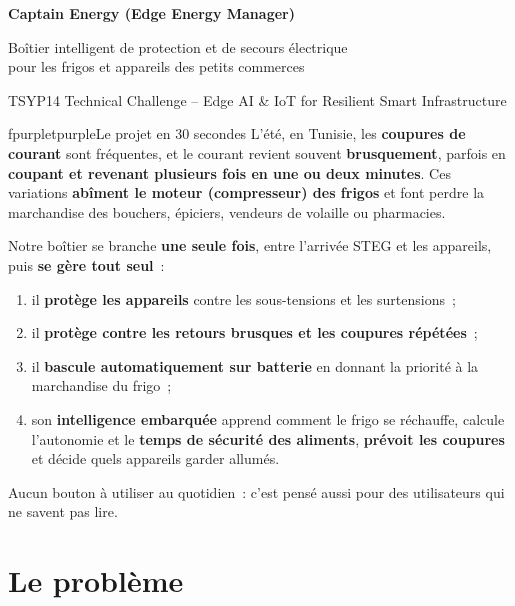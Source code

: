 \documentclass[10pt,a4paper]{article}
\begin{document}
\begin{tcolorbox}[enhanced, colback=fblue, colframe=fblue, arc=4mm, boxrule=0pt, left=5mm, right=5mm, top=4mm, bottom=4mm]
{\fontsize{22}{26}\selectfont\bfseries\color{secblue} Captain Energy (Edge Energy Manager)}\par\vspace{2mm}
{\large\color{subpurple} Boîtier intelligent de protection et de secours électrique\\ pour les frigos et appareils des petits commerces}\par\vspace{2mm}
{\small\color{gray!70!black} TSYP14 Technical Challenge -- Edge AI \& IoT for Resilient Smart Infrastructure}
\end{tcolorbox}

\begin{tbox}{fpurple}{tpurple}{Le projet en 30 secondes}
L'été, en Tunisie, les \textbf{coupures de courant} sont fréquentes, et le courant revient souvent \textbf{brusquement}, parfois en \textbf{coupant et revenant plusieurs fois en une ou deux minutes}. Ces variations \textbf{abîment le moteur (compresseur) des frigos} et font perdre la marchandise des bouchers, épiciers, vendeurs de volaille ou pharmacies.

Notre boîtier se branche \textbf{une seule fois}, entre l'arrivée STEG et les appareils, puis \textbf{se gère tout seul}~:
\begin{enumerate}[nosep, leftmargin=2em]
  \item il \textbf{protège les appareils} contre les sous-tensions et les surtensions~;
  \item il \textbf{protège contre les retours brusques et les coupures répétées}~;
  \item il \textbf{bascule automatiquement sur batterie} en donnant la priorité à la marchandise du frigo~;
  \item son \textbf{intelligence embarquée} apprend comment le frigo se réchauffe, calcule l'autonomie et le \textbf{temps de sécurité des aliments}, \textbf{prévoit les coupures} et décide quels appareils garder allumés.
\end{enumerate}
Aucun bouton à utiliser au quotidien~: c'est pensé aussi pour des utilisateurs qui ne savent pas lire.
\end{tbox}

\section{Le problème}
\end{document}
